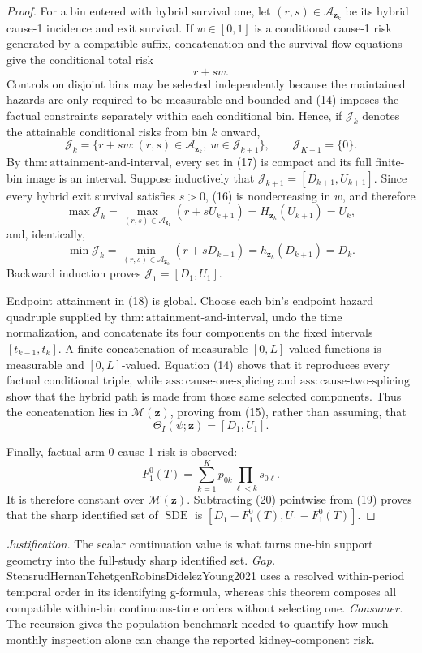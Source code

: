\documentclass{article}
\begin{document}
\begin{proof}
For a bin entered with hybrid survival one, let \((r,s)\in\mathcal A_{\mathbf z_k}\) be its hybrid cause-1 incidence and exit survival.  If \(w\in[0,1]\) is a conditional cause-1 risk generated by a compatible suffix, concatenation and the survival-flow equations give the conditional total risk
\[
 r+s w.                                                        \tag{16}
\]
Controls on disjoint bins may be selected independently because the maintained hazards are only required to be measurable and bounded and (14) imposes the factual constraints separately within each conditional bin.  Hence, if \(\mathcal J_k\) denotes the attainable conditional risks from bin \(k\) onward,
\[
 \mathcal J_k=\{r+s w:(r,s)\in\mathcal A_{\mathbf z_k},\ w\in\mathcal J_{k+1}\},
 \quad\quad \mathcal J_{K+1}=\{0\}.                              \tag{17}
\]
By \(\mathrm{thm{:}attainment\text{-}and\text{-}interval}\), every set in (17) is compact and its full finite-bin image is an interval.  Suppose inductively that \(\mathcal J_{k+1}=[D_{k+1},U_{k+1}]\).  Since every hybrid exit survival satisfies \(s>0\), (16) is nondecreasing in \(w\), and therefore
\[
 \max\mathcal J_k
 =\max_{(r,s)\in\mathcal A_{\mathbf z_k}}(r+sU_{k+1})
 =H_{\mathbf z_k}(U_{k+1})=U_k,
\]
and, identically,
\[
 \min\mathcal J_k
 =\min_{(r,s)\in\mathcal A_{\mathbf z_k}}(r+sD_{k+1})
 =h_{\mathbf z_k}(D_{k+1})=D_k.                              \tag{18}
\]
Backward induction proves \(\mathcal J_1=[D_1,U_1]\).

Endpoint attainment in (18) is global.  Choose each bin's endpoint hazard quadruple supplied by \(\mathrm{thm{:}attainment\text{-}and\text{-}interval}\), undo the time normalization, and concatenate its four components on the fixed intervals \([t_{k-1},t_k]\).  A finite concatenation of measurable \([0,L]\)-valued functions is measurable and \([0,L]\)-valued.  Equation (14) shows that it reproduces every factual conditional triple, while \(\mathrm{ass{:}cause\text{-}one\text{-}splicing}\) and \(\mathrm{ass{:}cause\text{-}two\text{-}splicing}\) show that the hybrid path is made from those same selected components.  Thus the concatenation lies in \(\mathcal M(\mathbf z)\), proving from (15), rather than assuming, that
\[
 \Theta_I(\psi;\mathbf z)=[D_1,U_1].                         \tag{19}
\]

Finally, factual arm-0 cause-1 risk is observed:
\[
 F_1^0(T)=\sum_{k=1}^K p_{0k}\prod_{\ell<k}s_{0\ell}.        \tag{20}
\]
It is therefore constant over \(\mathcal M(\mathbf z)\).  Subtracting (20) pointwise from (19) proves that the sharp identified set of \(\operatorname{SDE}\) is \([D_1-F_1^0(T),U_1-F_1^0(T)]\).
\end{proof}
\par\smallskip\noindent \textit{Justification.} The scalar continuation value is what turns one-bin support geometry into the full-study sharp identified set. \textit{Gap.} StensrudHernanTchetgenRobinsDidelezYoung2021 uses a resolved within-period temporal order in its identifying g-formula, whereas this theorem composes all compatible within-bin continuous-time orders without selecting one. \textit{Consumer.} The recursion gives the population benchmark needed to quantify how much monthly inspection alone can change the reported kidney-component risk.
\end{document}

